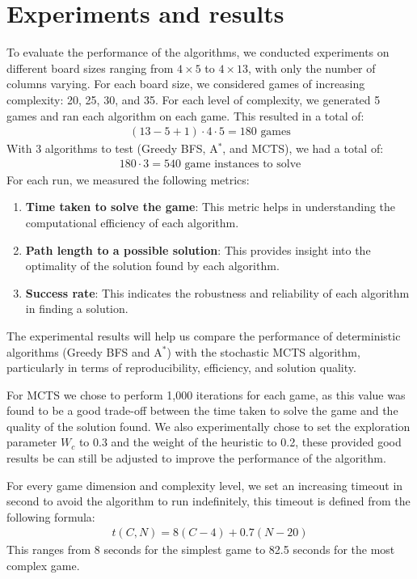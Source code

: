 \chapter{Experiments and results}
To evaluate the performance of the algorithms, we conducted experiments on different board sizes ranging from $4 \times 5$ to $4 \times 13$, with only the number of columns varying. For each board size, we considered games of increasing complexity: 20, 25, 30, and 35. For each level of complexity, we generated 5 games and ran each algorithm on each game. This resulted in a total of:
\begin{align*}
(13-5+1) \cdot 4 \cdot 5 = 180 \text{ games}
\end{align*}
With 3 algorithms to test (Greedy BFS, A$^*$, and MCTS), we had a total of:
\begin{align*}
  180 \cdot 3 = 540 \text{ game instances to solve}
\end{align*}
For each run, we measured the following metrics:
\begin{enumerate}
  \item \textbf{Time taken to solve the game}: This metric helps in understanding the computational efficiency of each algorithm.
  \item \textbf{Path length to a possible solution}: This provides insight into the optimality of the solution found by each algorithm.
  \item \textbf{Success rate}: This indicates the robustness and reliability of each algorithm in finding a solution.
\end{enumerate}
The experimental results will help us compare the performance of deterministic algorithms (Greedy BFS and A$^*$) with the stochastic MCTS algorithm, particularly in terms of reproducibility, efficiency, and solution quality.

For MCTS we chose to perform 1,000 iterations for each game, as this value was found to be a good trade-off between the time taken to solve the game and the quality of the solution found. We also experimentally chose to set the exploration parameter $W_c$ to 0.3 and the weight of the heuristic to 0.2, these provided good results be can still be adjusted to improve the performance of the algorithm.

For every game dimension and complexity level, we set an increasing timeout in second to avoid the algorithm to run indefinitely, this timeout is defined from the following formula:
\begin{align*}
  t(C, N) = 8(C-4) + 0.7(N-20)
\end{align*}
This ranges from 8 seconds for the simplest game to 82.5 seconds for the most complex game.

